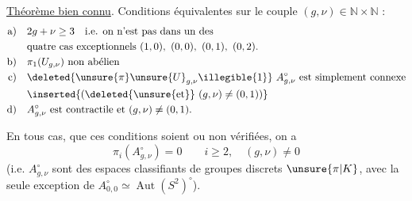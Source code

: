 

\uline{Théorème bien connu}. Conditions équivalentes sur le couple $(g,\nu)\in\mathbb N\times\mathbb N$ :
\[
\begin{aligned}
\text{a)}\quad &2g+\nu\geq3\quad\text{i.e. on n'est pas dans un des}\\
&\text{quatre cas exceptionnels }(1,0),\ (0,0),\ (0,1),\ (0,2).\\
\text{b)}\quad &\pi_1(U_{g,\nu})\text{ non abélien}\\
\text{c)}\quad &\deleted{\unsure{\pi}\unsure{U}_{g,\nu}\illegible{1}}\ A_{g,\nu}^{\circ}\text{ est simplement connexe}\\
&\inserted{\text{(}\deleted{\unsure{\text{et}}}\ (g,\nu)\ne(0,1)\text{)}}\\
\text{d)}\quad &A_{g,\nu}^{\circ}\text{ est contractile et }(g,\nu)\ne(0,1).
\end{aligned}
\]

En tous cas, que ces conditions soient ou non vérifiées, on a 
\[
\pi_i(A_{g,\nu}^{\circ})=0\qquad i\geq2,\quad(g,\nu)\ne0
\]
(i.e.  $A_{g,\nu}^{\circ}$ sont des espaces classifiants de groupes discrets $\unsure{\pi|K}$, avec la seule exception de $A_{0,0}^{\circ}\simeq\operatorname{Aut}(S^2)^{\circ}$).

